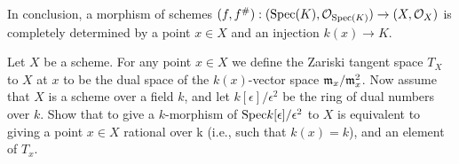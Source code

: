 \begin{sol}
	In conclusion, a morphism of schemes $(f,f^{\#}): (\mathrm{Spec} (K), \mathcal{O}_{\mathrm{Spec}(K)}) \to (X, \mathcal{O}_X)$ is completely determined by a point $x \in X$ and an injection $k(x) \to K$.
\end{sol}

\begin{ex}
	Let $X$ be a scheme. For any point $x \in X$ we define the Zariski tangent space $T_X$ to $X$ at $x$ to be the dual space of the $k(x)$-vector space $\mathfrak{m}_x/\mathfrak{m}_x^2$. Now assume that $X$ is a scheme over a field $k$, and let $k[\epsilon]/\epsilon^2$ be the ring of dual numbers over $k$. Show that to give a $k$-morphism of $\mathrm{Spec} k[\epsilon]/\epsilon^2$ to $X$ is equivalent to giving a point $x \in X$ rational over k (i.e., such that $k(x) = k$), and an element of $T_x$.
\end{ex}